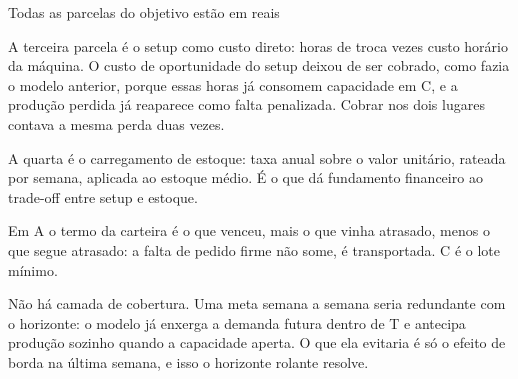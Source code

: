 \documentclass[11pt,aspectratio=169]{beamer}
\begin{document}
\begin{frame}{Todas as parcelas do objetivo estão em reais}
{  A terceira parcela é o setup como custo direto: horas de troca vezes custo horário da máquina.
  O custo de oportunidade do setup deixou de ser cobrado, como fazia o modelo anterior, porque
  essas horas já consomem capacidade em C, e a produção perdida já reaparece como falta penalizada.
  Cobrar nos dois lugares contava a mesma perda duas vezes.

  A quarta é o carregamento de estoque: taxa anual sobre o valor unitário, rateada por semana,
  aplicada ao estoque médio. É o que dá fundamento financeiro ao trade-off entre setup e estoque.

  Em A o termo da carteira é o que venceu, mais o que vinha atrasado, menos o que segue atrasado:
  a falta de pedido firme não some, é transportada. C é o lote mínimo.

  Não há camada de cobertura. Uma meta semana a semana seria redundante com o horizonte: o modelo
  já enxerga a demanda futura dentro de T e antecipa produção sozinho quando a capacidade aperta.
  O que ela evitaria é só o efeito de borda na última semana, e isso o horizonte rolante resolve.}
\end{frame}
\end{document}
